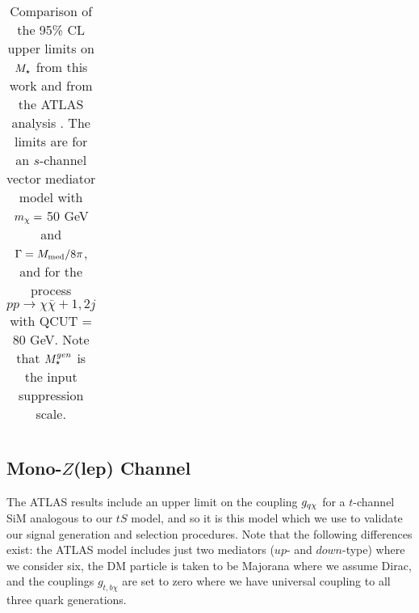 \begin{table}[!htbp]
\begin{tabular}{c|c|c|c}
 \hline
 \hline
\end{tabular}
\caption{Comparison of the 95\% CL upper limits on $M_{\star}$ from this work and from the ATLAS \monojet analysis \cite{Aad:2015zva}. The limits are for an $s$-channel vector mediator model with $m_{\chi} = $ 50 GeV and $\Gamma = M_{\mathrm{med}}/8\pi$, and for the process $pp \rightarrow \chi \bar{\chi} + 1, 2j$ with QCUT = 80 GeV. Note that $M_{\star}^{\tiny gen}$ is the input suppression scale.}
\label{M_star_limits_monojet}
\end{table}

\subsection{Mono-$Z$(lep) Channel}
\label{monoZ_validation}

The ATLAS \monoZ results include an upper limit on the coupling $g_{q \chi}$ for a $t$-channel SiM analogous to our $tS$ model, and so it is this model which we use to validate our signal generation and selection procedures. Note that the following differences exist: the ATLAS model includes just two mediators ($up$- and $down$-type) where we consider six, the DM particle is taken to be Majorana where we assume Dirac, and the couplings $g_{t,b \chi}$ are set to zero where we have universal coupling to all three quark generations.

